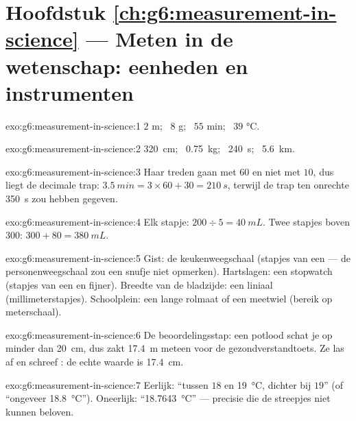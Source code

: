 \section*{Hoofdstuk \ref{ch:g6:measurement-in-science} --- Meten in de wetenschap: eenheden en instrumenten}

\begin{solution}{exo:g6:measurement-in-science:1}
$2$ \unit{m}; \ $8$ \unit{g}; \ $55$ \unit{min}; \ $39$
\unit{\celsius}.
\end{solution}

\begin{solution}{exo:g6:measurement-in-science:2}
\qty{320}{cm}; \ \qty{0.75}{kg}; \ \qty{240}{s}; \ \qty{5.6}{km}.
\end{solution}

\begin{solution}{exo:g6:measurement-in-science:3}
Haar treden gaan met $60$ en niet met $10$, dus liegt de decimale
trap: $\qty{3.5}{min} = 3 \times 60 + 30 = \qty{210}{s}$, terwijl de
trap ten onrechte \qty{350}{s} zou hebben gegeven.
\end{solution}

\begin{solution}{exo:g6:measurement-in-science:4}
Elk stapje: $200 \div 5 = \qty{40}{mL}$. Twee stapjes boven $300$:
$300 + 80 = \qty{380}{mL}$.
\end{solution}

\begin{solution}{exo:g6:measurement-in-science:5}
Gist: de keukenweegschaal (stapjes van een  --- de
personenweegschaal zou een snufje niet opmerken). Hartslagen: een
stopwatch (stapjes van een  en fijner). Breedte van de
bladzijde: een liniaal (millimeterstapjes). Schoolplein: een lange
rolmaat of een meetwiel (bereik op meterschaal).
\end{solution}

\begin{solution}{exo:g6:measurement-in-science:6}
De beoordelingsstap: een potlood schat je op minder dan \qty{20}{cm},
dus zakt \qty{17.4}{m} meteen voor de gezondverstandtoets. Ze las
 af en schreef : de echte waarde is
\qty{17.4}{cm}.
\end{solution}

\begin{solution}{exo:g6:measurement-in-science:7}
Eerlijk: ``tussen $18$ en \qty{19}{\celsius}, dichter bij $19$'' (of
``ongeveer \qty{18.8}{\celsius}''). Oneerlijk:
``\qty{18.7643}{\celsius}'' --- precisie die de streepjes niet kunnen
beloven.
\end{solution}

